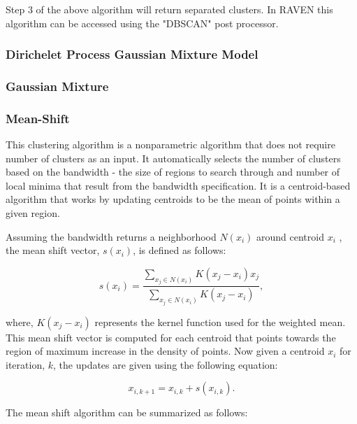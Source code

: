 \documentclass[11pt]{article}
\begin{document}
Step 3 of the above algorithm will return separated clusters. In RAVEN this algorithm can be accessed using the "DBSCAN" post processor. 

\subsubsection{Dirichelet Process Gaussian Mixture Model}

\subsubsection{Gaussian Mixture}



\subsubsection{Mean-Shift} 

This clustering algorithm is a nonparametric algorithm that does not require number of clusters as an input. It automatically selects the number of clusters based on the bandwidth - the size of regions to search through and number of local minima that result from the bandwidth specification. It is a centroid-based algorithm that works by updating centroids to be the mean of points within a given region.  

Assuming the bandwidth returns a neighborhood $N(x_i)$ around centroid $x_i$ , the mean shift vector, $s(x_i)$, is defined as follows:

\begin{equation}
\label{ms_vec}
s(x_i) = \frac{\sum_{x_j \in N(x_i)} K(x_j - x_i) x_j}{\sum_{x_j \in N(x_i)} K(x_j - x_i) },
\end{equation}

where, $K(x_j - x_i)$ represents the kernel function used for the weighted mean. This mean shift vector is computed for each centroid that points towards the region of maximum increase in the density of points. Now given a centroid $x_i$ for iteration, $k$, the updates are given using the following equation: 

\begin{equation}
x_{i, k+1} = x_{i, k} + s(x_{i, k}).
\end{equation}

The mean shift algorithm can be summarized as follows:
\end{document}
